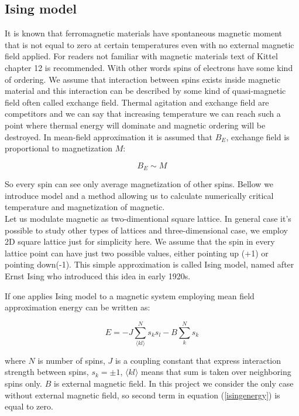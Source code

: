 \documentclass[10pt]{article}
\begin{document}
\subsection{Ising model}
It is known that ferromagnetic materials have spontaneous magnetic moment that is not equal to zero at certain temperatures even with no external magnetic field applied. For readers not familiar with magnetic materials text of Kittel \cite{Kittel} chapter 12 is recommended.
With other words spins of electrons have some kind of ordering. We assume that interaction between spins exists inside magnetic material and 
this interaction can be described by some kind of quasi-magnetic field often called exchange field. Thermal agitation and exchange field are competitors and we can say that increasing temperature we can reach such a point where thermal energy will dominate and magnetic ordering will be destroyed.
In mean-field approximation it is assumed that $B_E$, exchange field is proportional to magnetization $M$:

\[
B_E \sim M
\]

So every spin can see only average magnetization of other spins. Bellow we introduce model and a method allowing us to calculate numerically critical temperature and 
magnetization of magnetic. \\
Let us modulate magnetic as two-dimentional square lattice. In general case it's possible to study other types of lattices and three-dimensional case, we employ 2D square lattice
just for simplicity here. We assume that the spin in every lattice point can have just two possible values, either pointing up (+1) or pointing down(-1). This simple approximation is
called Ising model, named after Ernst Ising who introduced this idea in early 1920s.

If one applies Ising model to a magnetic system employing mean field approximation energy can be written as:

\begin{equation}\label{isingenergy}
E=-J\sum_{\langle kl\rangle }^{N}s_{k}s_{l} - B\sum_{k}^{N}s_k
\end{equation}

where $N$ is number of spins, $J$ is a coupling constant that express interaction
strength between spins, $s_{k}=\pm 1$, $\langle kl\rangle $
means that sum is taken over neighboring spins only. $B$ is external magnetic field.
In this project we consider the only case without external magnetic field, so second term in equation (\ref{isingenergy}) is equal to zero.\\
\end{document}
